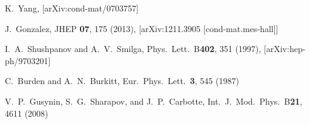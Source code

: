 \documentclass[aps,prd,twocolumn,showpacs,superscriptaddress,groupedaddress]{revtex4}  %
\begin{document}
\begin{thebibliography}{99}
K.~Yang, [arXiv:cond-mat/0703757]

J.~Gonzalez, JHEP {\bf 07}, 175 (2013), 	[arXiv:1211.3905 [cond-mat.mes-hall]]

I.~A.~Shushpanov and A.~V.~Smilga, Phys.\ Lett.\ B{\bf 402}, 351 (1997), [arXiv:hep-ph/9703201]

C.~Burden and A.~N.~Burkitt, Eur.\ Phys.\ Lett.\ {\bf 3}, 545 (1987)

V.~P.~Gusynin, S.~G.~Sharapov, and J.~P.~Carbotte, Int.\ J.\ Mod.\ Phys.\ B{\bf 21}, 4611 (2008) 

\end{thebibliography}
\end{document}
